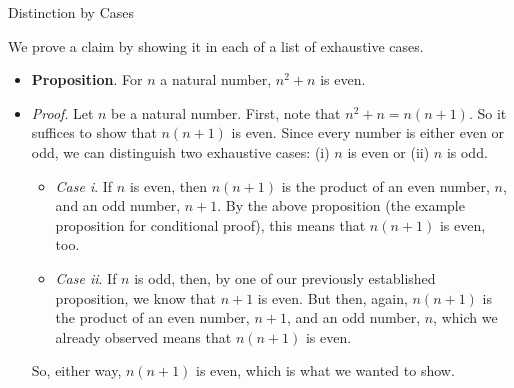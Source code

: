 \documentclass[../slides.tex]{subfiles}
\begin{document}
\begin{frame}{Distinction by Cases}

We prove a claim by showing it in each of a list of exhaustive cases.

\begin{itemize}
	\item \textbf{Proposition}. For $n$ a natural number, $n^2+n$ is even. 
	
	\item  \emph{Proof}. Let $n$ be a natural number. First, note that $n^2+n=n(n+1)$. So it suffices to show that $n(n+1)$ is even. Since every number is either even or odd, we can distinguish two exhaustive cases: (i) $n$ is even or (ii) $n$ is odd. 
			
			\begin{itemize}
			
				\item \emph{Case i}. If $n$ is even, then $n(n+1)$ is the product of an even number, $n$, and an odd number, $n+1$. By the above proposition (the example proposition for conditional proof), this means that $n(n+1)$ is even, too.
				
				\item \emph{Case ii}. If $n$ is odd, then, by one of our previously established proposition, we know that $n+1$ is even. But then, again, $n(n+1)$ is the product of an even number, $n+1$, and an odd number, $n$, which we already observed means that $n(n+1)$ is even.
			
			\end{itemize}
			
			So, either way, $n(n+1)$ is even, which is what we wanted to show.
			
	\end{itemize}

\end{frame}
\end{document}
